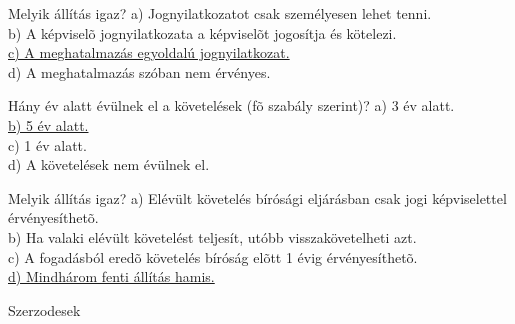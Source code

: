 \begin{frame}

\begin{tcolorbox}[title={145. Kérdés}]
Melyik állítás igaz?
\tcblower
a) Jognyilatkozatot csak személyesen lehet tenni.\\
b) A képviselõ jognyilatkozata a képviselõt jogosítja és kötelezi.\\
\uline {c) A meghatalmazás egyoldalú jognyilatkozat.}\\
d) A meghatalmazás szóban nem érvényes.
\end{tcolorbox}

\begin{tcolorbox}[title={146. Kérdés}]
Hány év alatt évülnek el a követelések (fõ szabály szerint)?
\tcblower
a) 3 év alatt.\\
\uline {b) 5 év alatt. }\\
c) 1 év alatt.\\
d) A követelések nem évülnek el.
\end{tcolorbox}

\begin{tcolorbox}[title={147. Kérdés}]
Melyik állítás igaz?
\tcblower
a) Elévült követelés bírósági eljárásban csak jogi képviselettel érvényesíthetõ.\\
b) Ha valaki elévült követelést teljesít, utóbb visszakövetelheti azt.\\
c) A fogadásból eredõ követelés bíróság elõtt 1 évig érvényesíthetõ.\\
\uline {d) Mindhárom fenti állítás hamis.}
\end{tcolorbox}

\end{frame}

\begin{frame}[plain]
\begin{tcolorbox}[center, colback={myyellow}, coltext={black}, colframe={myyellow}]
    { Szerzodesek}\\
\end{tcolorbox}
\end{frame}

